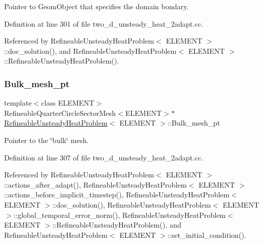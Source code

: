Pointer to Geom\+Object that specifies the domain bondary. 



Definition at line 301 of file two\+\_\+d\+\_\+unsteady\+\_\+heat\+\_\+2adapt.\+cc.



Referenced by Refineable\+Unsteady\+Heat\+Problem$<$ E\+L\+E\+M\+E\+N\+T $>$\+::doc\+\_\+solution(), and Refineable\+Unsteady\+Heat\+Problem$<$ E\+L\+E\+M\+E\+N\+T $>$\+::\+Refineable\+Unsteady\+Heat\+Problem().

\mbox{\label{classRefineableUnsteadyHeatProblem_afade341e03a4c97e62444c80adc9552f}} 
\subsubsection{\texorpdfstring{Bulk\+\_\+mesh\+\_\+pt}{Bulk\_mesh\_pt}}
{\footnotesize\ttfamily template$<$class E\+L\+E\+M\+E\+NT$>$ \\
Refineable\+Quarter\+Circle\+Sector\+Mesh$<$E\+L\+E\+M\+E\+NT$>$$\ast$ \hyperlink{classRefineableUnsteadyHeatProblem}{Refineable\+Unsteady\+Heat\+Problem}$<$ E\+L\+E\+M\+E\+NT $>$\+::Bulk\+\_\+mesh\+\_\+pt\hspace{0.3cm}{\ttfamily [private]}}



Pointer to the \char`\"{}bulk\char`\"{} mesh. 



Definition at line 307 of file two\+\_\+d\+\_\+unsteady\+\_\+heat\+\_\+2adapt.\+cc.



Referenced by Refineable\+Unsteady\+Heat\+Problem$<$ E\+L\+E\+M\+E\+N\+T $>$\+::actions\+\_\+after\+\_\+adapt(), Refineable\+Unsteady\+Heat\+Problem$<$ E\+L\+E\+M\+E\+N\+T $>$\+::actions\+\_\+before\+\_\+implicit\+\_\+timestep(), Refineable\+Unsteady\+Heat\+Problem$<$ E\+L\+E\+M\+E\+N\+T $>$\+::doc\+\_\+solution(), Refineable\+Unsteady\+Heat\+Problem$<$ E\+L\+E\+M\+E\+N\+T $>$\+::global\+\_\+temporal\+\_\+error\+\_\+norm(), Refineable\+Unsteady\+Heat\+Problem$<$ E\+L\+E\+M\+E\+N\+T $>$\+::\+Refineable\+Unsteady\+Heat\+Problem(), and Refineable\+Unsteady\+Heat\+Problem$<$ E\+L\+E\+M\+E\+N\+T $>$\+::set\+\_\+initial\+\_\+condition().

